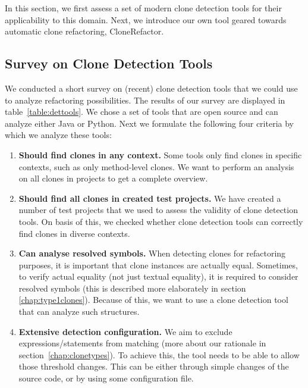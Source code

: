 \documentclass[a4paper]{article}
\begin{document}
In this section, we first assess a set of modern clone detection tools for their applicability to this domain. Next, we introduce our own tool geared towards automatic clone refactoring, CloneRefactor.%

\subsection{Survey on Clone Detection Tools}
\label{ch:tool-overview}
We conducted a short survey on (recent) clone detection tools that we could use to analyze refactoring possibilities. The results of our survey are displayed in table~\ref{table:dettools}. We chose a set of tools that are open source and can analyze either Java or Python. Next we formulate the following four criteria by which we analyze these tools:
\begin{enumerate}
    \item \textbf{Should find clones in any context.} Some tools only find clones in specific contexts, such as only method-level clones. We want to perform an analysis on all clones in projects to get a complete overview.
\item \textbf{Should find all clones in created test projects.} We have created a number of test projects that we used to assess the validity of clone detection tools. On basis of this, we checked whether clone detection tools can correctly find clones in diverse contexts.
\item \textbf{Can analyse resolved symbols.} When detecting clones for refactoring purposes, it is important that clone instances are actually equal. Sometimes, to verify actual equality (not just textual equality), it is required to consider resolved symbols (this is described more elaborately in section \ref{chap:type1clones}). Because of this, we want to use a clone detection tool that can analyze such structures.
\item \textbf{Extensive detection configuration.} We aim to exclude expressions/statements from matching (more about our rationale in section~\ref{chap:clonetypes}). To achieve this, the tool needs to be able to allow those threshold changes. This can be either through simple changes of the source code, or by using some configuration file.
\end{enumerate}
\end{document}
